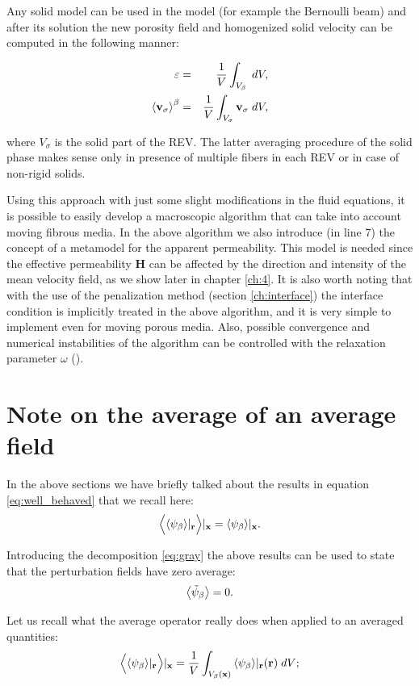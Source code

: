 \vspace{0.5cm}
Any solid model can be used in the model (for example the Bernoulli beam) and after its solution the new porosity field and homogenized solid velocity can be computed in the following manner:


\begin{eqnarray}
	\varepsilon &=& \dfrac{1}{V} \int_{V_\beta} \; dV,  \nonumber \\
{\left< \textbf{v}_{\sigma} \right>}^{\beta} &=& \dfrac{1}{V} \int_{V_{\sigma}} \textbf{v}_{\sigma} \; dV, \nonumber 
\end{eqnarray}

\noindent where $V_{\sigma}$ is the solid part of the REV.
The latter averaging procedure of the solid phase makes sense only in presence of multiple fibers in each REV or in case of non-rigid solids.

Using this approach with just some slight modifications in the fluid equations, it is possible to easily develop a macroscopic algorithm that can take into account moving fibrous media.
In the above algorithm we also introduce (in line 7) the concept of a metamodel for the apparent permeability. This model is needed since the effective permeability $\mathbf{H}$ can be affected by the direction and intensity of the mean velocity field, as we show later in chapter \ref{ch:4}.
It is also worth noting that with the use of the penalization method (section \ref{ch:interface}) the interface condition is implicitly treated in the above algorithm, and it is very simple to implement even for moving porous media.
Also, possible convergence and numerical instabilities of the algorithm can be controlled with the relaxation parameter $\omega$ (\citet{irons1969aitken}).

\section{Note on the average of an average field}
\label{ch:appendix_a}

In the above sections we have briefly talked about the results in equation \eqref{eq:well_behaved} that we recall here:
$$\Big<{\left< \psi_{\beta} \right>}|_{\mathbf{r}} \Big>|_{\mathbf{x}} = {\left< \psi_{\beta} \right>}|_{\mathbf{x}}.$$

\noindent Introducing the decomposition \eqref{eq:gray} the above results can be used to state that the perturbation fields have zero average:
$$  {\left< \tilde{\psi}_{\beta} \right>} = 0.$$

\noindent Let us recall what the average operator really does when applied to an averaged quantities:
$$  \Big< {\left< \psi_{\beta} \right>}|_{\mathbf{r}} \Big>|_{\mathbf{x}}  = \dfrac{1}{V} \int_{V_\beta(\mathbf{x})} {\left< \psi_{\beta} \right>}|_{\mathbf{r}}(\mathbf{r}) \; dV; $$

